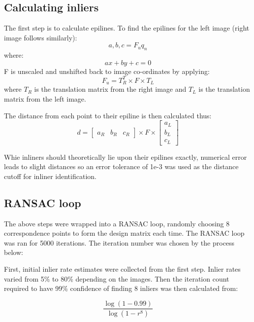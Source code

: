 \documentclass[10pt,a4paper]{article}
\begin{document}
\subsection*{Calculating inliers}
The first step is to calculate epilines. To find the epilines for the left image (right image follows similarly):
\begin{equation}
	a, b, c = F_uq_n
\end{equation}
where:
\begin{equation}
	ax + by + c = 0
\end{equation}
F is unscaled and unshifted back to image co-ordinates by applying:
\begin{equation}
	F_u = T_R^T \times F \times T_L
\end{equation}
where $T_R$ is the translation matrix from the right image and $T_L$ is the translation matrix from the left image.

The distance from each point to their epiline is then calculated thus:
\begin{equation}
	d =
	\begin{bmatrix}
		a_R & b_R & c_R
	\end{bmatrix}
	\times 
	F
	\times
	\begin{bmatrix}
		a_L \\
		b_L \\
		c_L
	\end{bmatrix}
\end{equation}

Whie inliners should theoretically lie upon their epilines exactly, numerical error leads to slight distances so an error tolerance of 1e-3 was used as the distance cutoff for inliner identification.

\subsection*{RANSAC loop}
The above steps were wrapped into a RANSAC loop, randomly choosing 8 correspondence points to form the design matrix each time. The RANSAC loop was ran for 5000 iterations. The iteration number was chosen by the process below:

First, initial inlier rate estimates were collected from the first step. Inlier rates varied from 5\% to 80\% depending on the images. Then the iteration count required to have 99\% confidence of finding 8 inliers was then calculated from:

\begin{equation}
	\frac{\log(1 - 0.99)}{\log(1 - r^8)}
\end{equation}
\end{document}

